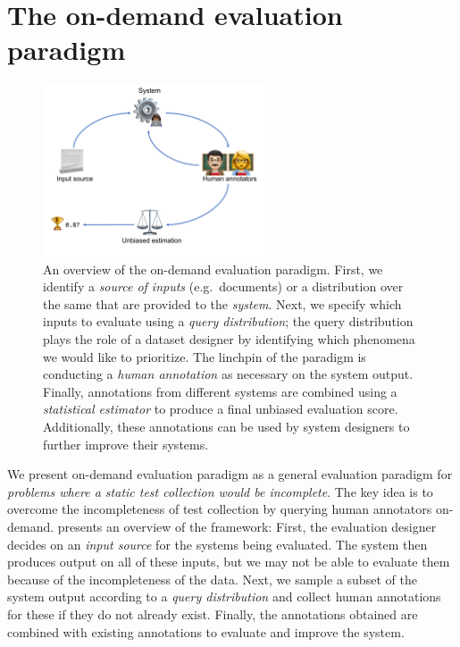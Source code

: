 \section{The on-demand evaluation paradigm}
\begin{figure}
  \centering
  \includegraphics[width=0.6\textwidth]{figures/overview}
  \caption[Overview of the on-demand evaluation paradigm]{\label{fig:conclusions:overview}
  An overview of the on-demand evaluation paradigm. 
  First, we identify a \textit{source of inputs} (e.g.\ documents) or a distribution over the same that are provided to the \textit{system}.
  Next, we specify which inputs to evaluate using a \textit{query distribution}; the query distribution plays the role of a dataset designer by identifying which phenomena we would like to prioritize.
  The linchpin of the paradigm is conducting a \textit{human annotation} as necessary on the system output. 
  Finally, annotations from different systems are combined using a \textit{statistical estimator} to produce a final unbiased evaluation score.
  Additionally, these annotations can be used by system designers to further improve their systems.
  }
\end{figure}

We present on-demand evaluation paradigm as a general evaluation paradigm for \textit{problems where a static test collection would be incomplete}.
The key idea is to overcome the incompleteness of test collection by querying human annotators on-demand.
 presents an overview of the framework: 
First, the evaluation designer decides on an \textit{input source} for the systems being evaluated.
The system then produces output on all of these inputs, but we may not be able to evaluate them because of the incompleteness of the data.
Next, we sample a subset of the system output according to a \textit{query distribution} and collect human annotations for these if they do not already exist.
Finally, the annotations obtained are combined with existing annotations to evaluate and improve the system.

